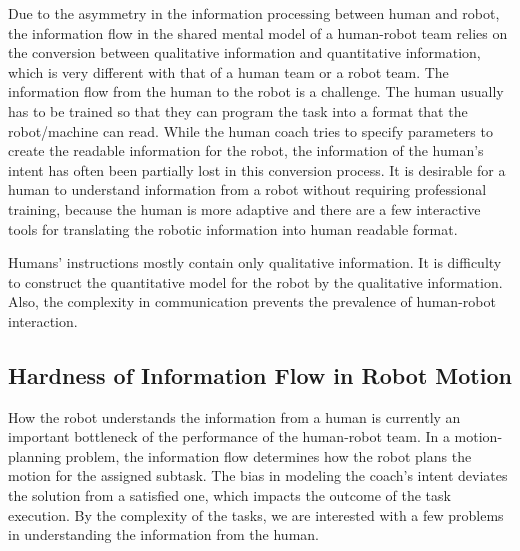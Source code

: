 \documentclass[phd]{byuprop}
\begin{document}
Due to the asymmetry in the information processing between human and robot, the information flow in the shared mental model of a human-robot team relies on the conversion between qualitative information and quantitative information, which is very different with that of a human team or a robot team.
The information flow from the human to the robot is a challenge.
The human usually has to be trained so that they can program the task into a format that the robot/machine can read.
While the human coach tries to specify parameters to create the readable information for the robot, the information of the human's intent has often been partially lost in this conversion process.
It is desirable for a human to understand information from a robot without requiring professional training, because the human is more adaptive and there are a few interactive tools for translating the robotic information into human readable format.

Humans' instructions mostly contain only qualitative information.
It is difficulty to construct the quantitative model for the robot by the qualitative information.
Also, the complexity in communication prevents the prevalence of human-robot interaction.

\subsection{Hardness of Information Flow in Robot Motion}

How the robot understands the information from a human is currently an important bottleneck of the performance of the human-robot team.
In a motion-planning problem, the information flow determines how the robot plans the motion for the assigned subtask. 
The bias in modeling the coach's intent deviates the solution from a satisfied one, which impacts the outcome of the task execution.
By the complexity of the tasks, we are interested with a few problems in understanding the information from the human.
\end{document}
